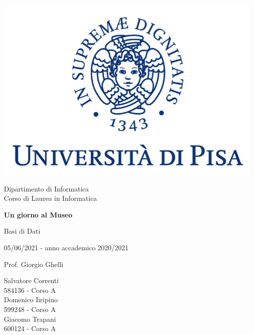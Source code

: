 \documentclass[10pt, italian, openany, landscape, fleqn]{book}
\begin{document}
\begin{titlepage}
	\clearpage\thispagestyle{empty}
	\centering
	\vspace{1cm}

    \includegraphics[scale=0.60]{unipi-logo.png}
    
	{\normalsize \noindent Dipartimento di Informatica \\
	             Corso di Laurea in Informatica \par}
	
	\vspace{2cm}
	{\Huge \textbf{Un giorno al Museo} \par}
	\vspace{1cm}
	{\large Basi di Dati}

    {\large {05/06/2021 - anno accademico 2020/2021}}

    \begin{minipage}[t]{0.47\textwidth}
    	{\large{ Prof. Giorgio Ghelli}}
    \end{minipage}\hfill\begin{minipage}[t]{0.47\textwidth}\raggedleft
        {\large {Salvatore Correnti \\ 584136 - Corso A\\ }}
        {\large {Domenico Iiripino \\ 599248 - Corso A\\ }}
    	{\large {Giacomo Trapani \\ 600124 - Corso A\\ }}
    \end{minipage}

    \vspace{4cm}

	\pagebreak

\end{titlepage}
\end{document}

